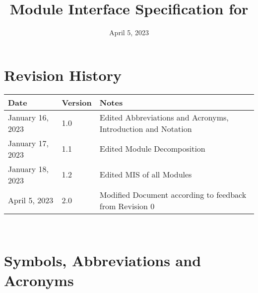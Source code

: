 \documentclass[12pt, titlepage]{article}
\begin{document}
\title{Module Interface Specification for \progname{}}

\author{\authname}

\date{April 5, 2023}

\maketitle


\section{Revision History}

\begin{tabularx}{\textwidth}{p{3cm}p{2cm}X}
\toprule {\bf Date} & {\bf Version} & {\bf Notes}\\
\midrule
January 16, 2023 & 1.0 & Edited Abbreviations and Acronyms, Introduction and Notation \\
January 17, 2023 & 1.1 & Edited Module Decomposition\\
January 18, 2023 & 1.2 & Edited MIS of all Modules \\
April 5, 2023 & 2.0 & Modified Document according to feedback from Revision 0\\
\bottomrule
\end{tabularx}

~\newpage

\section{Symbols, Abbreviations and Acronyms}
\end{document}
